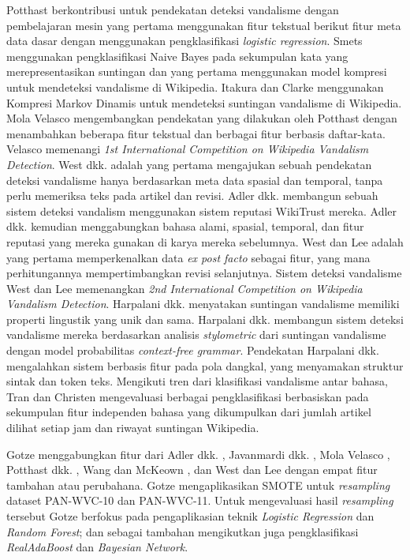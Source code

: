 \documentclass[12pt,a4paper,titlepage]{article}
\begin{document}
Potthast \cite{potthast2008automatic} berkontribusi untuk pendekatan deteksi vandalisme dengan pembelajaran mesin yang pertama menggunakan fitur tekstual berikut fitur meta data dasar dengan menggunakan pengklasifikasi \textit{logistic regression}.
Smets \cite{smets08automaticvandalism} menggunakan pengklasifikasi Naive Bayes pada sekumpulan kata yang merepresentasikan suntingan dan yang pertama menggunakan model kompresi untuk mendeteksi vandalisme di Wikipedia.
Itakura dan Clarke \cite{itakura2009using} menggunakan Kompresi Markov Dinamis untuk mendeteksi suntingan vandalisme di Wikipedia.
Mola Velasco \cite{mola2012wikipedia} mengembangkan pendekatan yang dilakukan oleh Potthast \cite{potthast2008automatic} dengan menambahkan beberapa fitur tekstual dan berbagai fitur berbasis daftar-kata.
Velasco memenangi \textit{1st International Competition on Wikipedia Vandalism Detection}.
West dkk. \cite{west2011multilingual} adalah yang pertama mengajukan sebuah pendekatan deteksi vandalisme hanya berdasarkan meta data spasial dan temporal, tanpa perlu memeriksa teks pada artikel dan revisi.
Adler dkk. \cite{adler2010detecting} membangun sebuah sistem deteksi vandalism menggunakan sistem reputasi WikiTrust mereka.
Adler dkk. \cite{adler2011wikipedia} kemudian menggabungkan bahasa alami, spasial, temporal, dan fitur reputasi yang mereka gunakan di karya mereka sebelumnya.
West dan Lee \cite{west2011multilingual} adalah yang pertama memperkenalkan data \textit{ex post facto} sebagai fitur, yang mana perhitungannya mempertimbangkan revisi selanjutnya.
Sistem deteksi vandalisme West dan Lee memenangkan \textit{2nd International Competition on Wikipedia Vandalism Detection}.
Harpalani dkk. \cite{harpalani2011language} menyatakan suntingan vandalisme memiliki properti lingustik yang unik dan sama. Harpalani dkk. membangun sistem deteksi vandalisme mereka berdasarkan analisis \textit{stylometric} dari suntingan vandalisme dengan model probabilitas \textit{context-free grammar}.
Pendekatan Harpalani dkk. mengalahkan sistem berbasis fitur pada pola dangkal, yang menyamakan struktur sintak dan token teks.
Mengikuti tren dari klasifikasi vandalisme antar bahasa, Tran dan Christen \cite{tran2013cross} mengevaluasi berbagai pengklasifikasi berbasiskan pada sekumpulan fitur independen bahasa yang dikumpulkan dari jumlah artikel dilihat setiap jam dan riwayat suntingan Wikipedia.

Gotze \cite{gotze2014advanced} menggabungkan fitur dari Adler dkk. \cite{adler2011wikipedia}, Javanmardi dkk. \cite{javanmardi2011vandalism}, Mola Velasco \cite{mola2012wikipedia}, Potthast dkk. \cite{potthast2008automatic}, Wang dan McKeown \cite{wang2010got}, dan West dan Lee \cite{west2011multilingual} dengan empat fitur tambahan atau perubahana.
Gotze mengaplikasikan SMOTE untuk \textit{resampling} dataset PAN-WVC-10 dan PAN-WVC-11.
Untuk mengevaluasi hasil \textit{resampling} tersebut Gotze berfokus pada pengaplikasian teknik \textit{Logistic Regression} dan \textit{Random Forest};
dan sebagai tambahan mengikutkan juga pengklasifikasi \textit{RealAdaBoost} dan \textit{Bayesian Network}.
\end{document}
